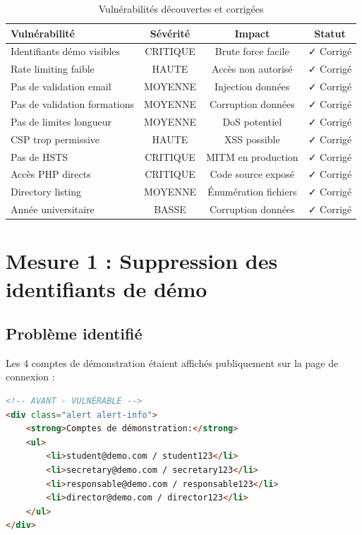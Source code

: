 \documentclass[11pt,a4paper,french]{report}
\begin{document}
\begin{table}[H]
\centering
\caption{Vulnérabilités découvertes et corrigées}
\begin{tabular}{|l|c|c|c|}
\hline
\textbf{Vulnérabilité} & \textbf{Sévérité} & \textbf{Impact} & \textbf{Statut} \\
\hline
Identifiants démo visibles & CRITIQUE & Brute force facile & ✓ Corrigé \\
\hline
Rate limiting faible & HAUTE & Accès non autorisé & ✓ Corrigé \\
\hline
Pas de validation email & MOYENNE & Injection données & ✓ Corrigé \\
\hline
Pas de validation formations & MOYENNE & Corruption données & ✓ Corrigé \\
\hline
Pas de limites longueur & MOYENNE & DoS potentiel & ✓ Corrigé \\
\hline
CSP trop permissive & HAUTE & XSS possible & ✓ Corrigé \\
\hline
Pas de HSTS & CRITIQUE & MITM en production & ✓ Corrigé \\
\hline
Accès PHP directs & CRITIQUE & Code source exposé & ✓ Corrigé \\
\hline
Directory listing & MOYENNE & Énumération fichiers & ✓ Corrigé \\
\hline
Année universitaire & BASSE & Corruption données & ✓ Corrigé \\
\hline
\end{tabular}
\end{table}

\newpage

\section{Mesure 1 : Suppression des identifiants de démo}

\subsection{Problème identifié}

Les 4 comptes de démonstration étaient affichés publiquement sur la page de connexion :

\begin{lstlisting}[language=HTML]
<!-- AVANT - VULNÉRABLE -->
<div class="alert alert-info">
    <strong>Comptes de démonstration:</strong>
    <ul>
        <li>student@demo.com / student123</li>
        <li>secretary@demo.com / secretary123</li>
        <li>responsable@demo.com / responsable123</li>
        <li>director@demo.com / director123</li>
    </ul>
</div>
\end{lstlisting}
\end{document}
